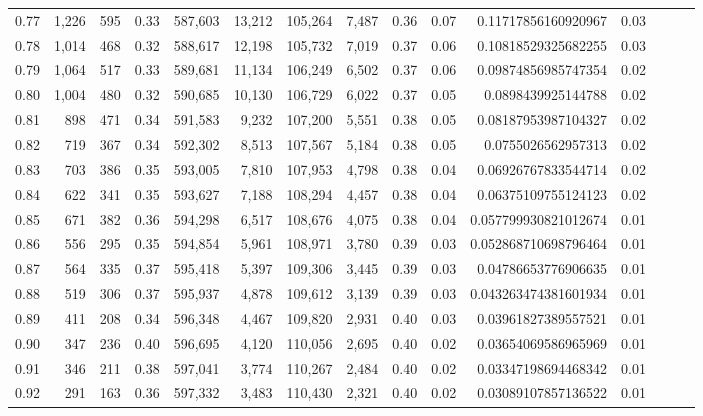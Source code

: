 \begin{tabular}{rrrrrrrrrrrrrrr}
0.77 &   1,226 &    595 &  0.33 &  587,603 &   13,212 &  105,264 &    7,487 &  0.36 &  0.07 &   0.11717856160920967 &      0.03 \\
0.78 &   1,014 &    468 &  0.32 &  588,617 &   12,198 &  105,732 &    7,019 &  0.37 &  0.06 &   0.10818529325682255 &      0.03 \\
0.79 &   1,064 &    517 &  0.33 &  589,681 &   11,134 &  106,249 &    6,502 &  0.37 &  0.06 &   0.09874856985747354 &      0.02 \\
0.80 &   1,004 &    480 &  0.32 &  590,685 &   10,130 &  106,729 &    6,022 &  0.37 &  0.05 &    0.0898439925144788 &      0.02 \\
0.81 &     898 &    471 &  0.34 &  591,583 &    9,232 &  107,200 &    5,551 &  0.38 &  0.05 &   0.08187953987104327 &      0.02 \\
0.82 &     719 &    367 &  0.34 &  592,302 &    8,513 &  107,567 &    5,184 &  0.38 &  0.05 &    0.0755026562957313 &      0.02 \\
0.83 &     703 &    386 &  0.35 &  593,005 &    7,810 &  107,953 &    4,798 &  0.38 &  0.04 &   0.06926767833544714 &      0.02 \\
0.84 &     622 &    341 &  0.35 &  593,627 &    7,188 &  108,294 &    4,457 &  0.38 &  0.04 &   0.06375109755124123 &      0.02 \\
0.85 &     671 &    382 &  0.36 &  594,298 &    6,517 &  108,676 &    4,075 &  0.38 &  0.04 &  0.057799930821012674 &      0.01 \\
0.86 &     556 &    295 &  0.35 &  594,854 &    5,961 &  108,971 &    3,780 &  0.39 &  0.03 &  0.052868710698796464 &      0.01 \\
0.87 &     564 &    335 &  0.37 &  595,418 &    5,397 &  109,306 &    3,445 &  0.39 &  0.03 &   0.04786653776906635 &      0.01 \\
0.88 &     519 &    306 &  0.37 &  595,937 &    4,878 &  109,612 &    3,139 &  0.39 &  0.03 &  0.043263474381601934 &      0.01 \\
0.89 &     411 &    208 &  0.34 &  596,348 &    4,467 &  109,820 &    2,931 &  0.40 &  0.03 &   0.03961827389557521 &      0.01 \\
0.90 &     347 &    236 &  0.40 &  596,695 &    4,120 &  110,056 &    2,695 &  0.40 &  0.02 &   0.03654069586965969 &      0.01 \\
0.91 &     346 &    211 &  0.38 &  597,041 &    3,774 &  110,267 &    2,484 &  0.40 &  0.02 &   0.03347198694468342 &      0.01 \\
0.92 &     291 &    163 &  0.36 &  597,332 &    3,483 &  110,430 &    2,321 &  0.40 &  0.02 &   0.03089107857136522 &      0.01 \\

\end{tabular}
